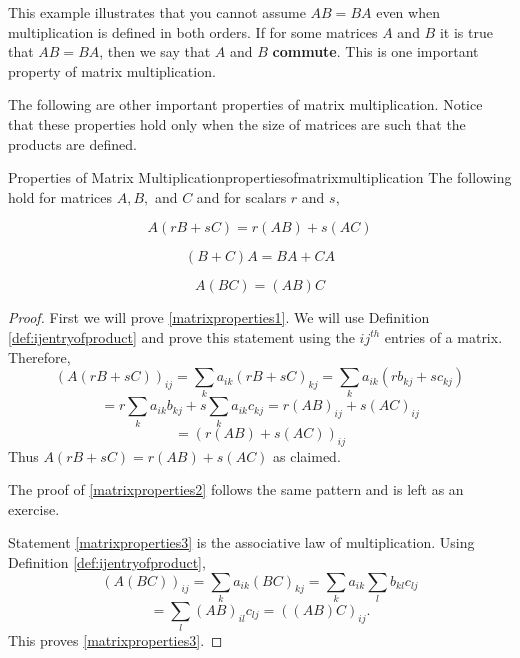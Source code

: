 This example illustrates that you cannot assume $AB=BA$ even when
multiplication is defined in both orders. If for some matrices $A$ and
$B$ it is true that $AB=BA$, then we say that $A$ and $B$ \textbf{commute}. This is one 
important property of matrix multiplication.

The following are other important properties of matrix multiplication.
Notice that these properties hold only when the size of matrices are such that the products are defined. 

\begin{proposition}{Properties of Matrix Multiplication}{propertiesofmatrixmultiplication}
The following hold for matrices $A,B,$ and $C$ and for scalars $r$ and $s$,

\begin{equation}
A\left( rB+sC\right) =r\left( AB\right) +s\left( AC\right)  \label{matrixproperties1}
\end{equation}

\begin{equation}
\left( B+C\right) A=BA+CA  \label{matrixproperties2}
\end{equation}

\begin{equation}
A\left( BC\right) =\left( AB\right) C  \label{matrixproperties3}
\end{equation}
\end{proposition}

\ifdefined\showproofs
\begin{proof}
 First we will prove \ref{matrixproperties1}. We will use Definition \ref{def:ijentryofproduct} 
and prove this statement using the $ij^{th}$ entries of a matrix. 
Therefore, 
\begin{equation*}
\left( A\left( rB+sC\right) \right) _{ij}=\sum_{k}a_{ik}\left( rB+sC\right)
_{kj}=\sum_{k}a_{ik}\left( rb_{kj}+sc_{kj}\right)
\end{equation*}
\begin{equation*}
=r\sum_{k}a_{ik}b_{kj}+s\sum_{k}a_{ik}c_{kj}=r\left( AB\right) _{ij}+s\left(
AC\right) _{ij}
\end{equation*}
\begin{equation*}
=\left( r\left( AB\right) +s\left( AC\right) \right) _{ij}
\end{equation*}
Thus $A\left( rB+sC\right) =r(AB)+s(AC)$ as claimed. 

The proof of \ref{matrixproperties2} follows the same pattern and is left as an exercise. 

Statement \ref{matrixproperties3} is the associative law of multiplication. Using
Definition \ref{def:ijentryofproduct},
\begin{equation*}
\left( A\left( BC\right) \right) _{ij}=\sum_{k}a_{ik}\left( BC\right)
_{kj}=\sum_{k}a_{ik}\sum_{l}b_{kl}c_{lj}
\end{equation*}
\begin{equation*}
=\sum_{l}\left( AB\right) _{il}c_{lj}=\left( \left( AB\right) C\right) _{ij}.
\end{equation*}
This proves \ref{matrixproperties3}.
\end{proof}
\fi